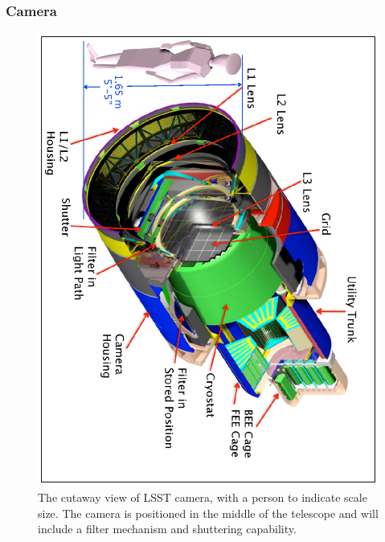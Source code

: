 \documentclass{emulateapj}
\begin{document}
\vskip 0.2in
\subsubsection{ Camera }


\begin{figure}[t!]
\hskip -1.7in
\includegraphics[width=1.55\hsize,angle=90.0,clip]{camera2009.ps}
\vskip -2.5in
\caption{The cutaway view of LSST camera, with a person to indicate scale size. 
The camera is positioned in the middle of the telescope and will include a filter 
mechanism and shuttering capability.} 
\label{Fig:camera}
\end{figure}
\end{document}
